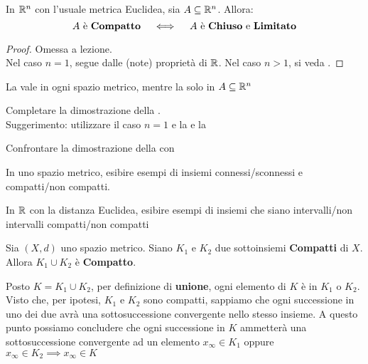 \begin{proposition}
	\label{prop:compat_chius_lim_Rn}
	In $\mathbb{R}^n$ con l'usuale metrica Euclidea, sia $A \subseteq \mathbb{R}^n$. Allora:
	\[A \text{ è \textbf{Compatto}} \quad \iff \quad A \text{ è \textbf{Chiuso} e \textbf{Limitato}}\]
	\begin{proof}
		Omessa a lezione.\\
		\cbstart
		Nel caso $n = 1$, segue dalle (note) proprietà di $\mathbb{R}$. Nel caso $n > 1$, si veda .
		\cbend
	\end{proof}
\end{proposition}
\begin{note}
	La  vale in ogni spazio metrico, mentre la  solo in $A \subseteq \mathbb{R}^n$
\end{note}
\cbstart
\begin{exercise}
	\label{ex:compat_chius_lim_Rn}
	Completare la dimostrazione della .\\
	Suggerimento: utilizzare il caso $n = 1$ e la e la 
\end{exercise}
\begin{exercise}
	Confrontare la dimostrazione della  con 
\end{exercise}
\cbend
\begin{exercise}
	In uno spazio metrico, esibire esempi di insiemi connessi/sconnessi e compatti/non compatti.
\end{exercise}
\begin{exercise}
	In $\mathbb{R}$ con la distanza Euclidea, esibire esempi di insiemi che siano intervalli/non intervalli compatti/non compatti
\end{exercise}
\begin{exercise}
	\label{ex:unione_compatti}
	Sia $(X,d)$ uno spazio metrico. Siano $K_1$ e $K_2$ due sottoinsiemi \textbf{Compatti} di $X$. Allora $K_1 \cup K_2$ è \textbf{Compatto}.
	\begin{solution}
		Posto $K = K_1 \cup K_2$, per definizione di \textbf{unione}, ogni elemento di $K$ è in $K_1$ o $K_2$.\\
		Visto che, per ipotesi, $K_1$ e $K_2$ sono compatti, sappiamo che ogni successione in uno dei due avrà una sottosuccessione convergente nello stesso insieme. A questo punto possiamo concludere che ogni successione in $K$ ammetterà una sottosuccessione convergente ad un elemento $x_\infty \in K_1$ oppure $x_\infty \in K_2 \implies x_\infty \in K$
	\end{solution}
\end{exercise}

